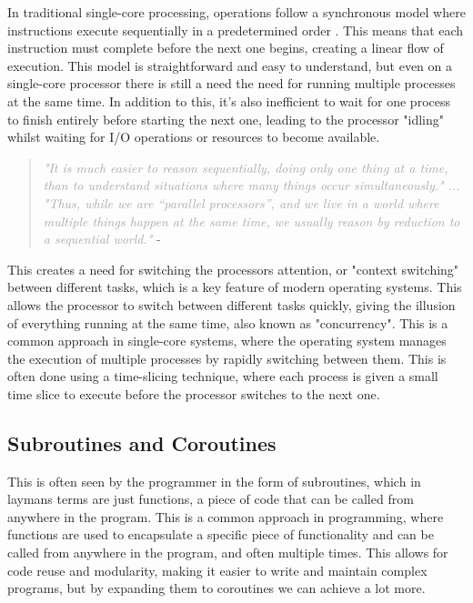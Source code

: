 \documentclass[12pt,a4paper]{article}
\begin{document}
In traditional single-core processing, operations follow a synchronous model where instructions execute sequentially in a predetermined order \parencite[p. 118]{Johnson2015}. This means that each instruction must complete before the next one begins, creating a linear flow of execution. This model is straightforward and easy to understand, but even on a single-core processor there is still a need the need for running multiple processes at the same time. In addition to this, it's also inefficient to wait for one process to finish entirely before starting the next one, leading to the processor "idling" whilst waiting for I/O operations or resources to become available.

\begin{quote}
    \textit{\textcolor{darkgray}{"It is much easier to reason sequentially, doing only one thing at a time, than to understand situations where many things occur simultaneously." ... "Thus, while we are “parallel processors”, and we live in a world where multiple things happen at the same time, we usually reason by reduction to a sequential world."}} - \cite{Rajsbaum2020}
\end{quote}

This creates a need for switching the processors attention, or "context switching" between different tasks, which is a key feature of modern operating systems. This allows the processor to switch between different tasks quickly, giving the illusion of everything running at the same time, also known as "concurrency"\parencite{Rajsbaum2020}. This is a common approach in single-core systems, where the operating system manages the execution of multiple processes by rapidly switching between them. This is often done using a time-slicing technique, where each process is given a small time slice to execute before the processor switches to the next one.

\subsection{Subroutines and Coroutines}

This is often seen by the programmer in the form of subroutines, which in laymans terms are just functions, a piece of code that can be called from anywhere in the program. This is a common approach in programming, where functions are used to encapsulate a specific piece of functionality and can be called from anywhere in the program, and often multiple times. This allows for code reuse and modularity, making it easier to write and maintain complex programs, but by expanding them to coroutines we can achieve a lot more.
\end{document}
